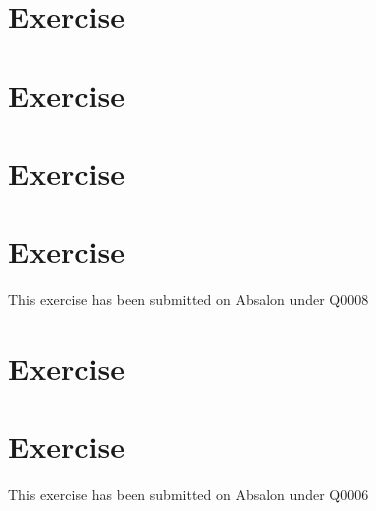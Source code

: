 \documentclass[a4paper]{article}
\begin{document}
\maketitle

\newpage
\tableofcontents
\newpage

\section{Exercise}


\section{Exercise}


\section{Exercise}
\subsection{}

\subsection{}


\section{Exercise}
This exercise has been submitted on Absalon under Q0008

\section{Exercise}


\section{Exercise}
This exercise has been submitted on Absalon under Q0006
\end{document}
